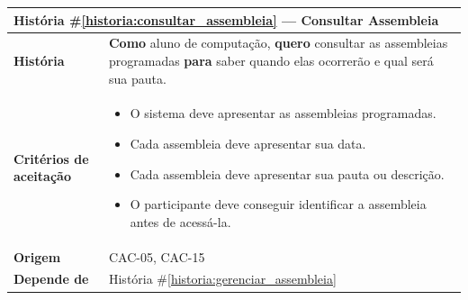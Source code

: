 \documentclass[12pt,a4paper]{article}
\newcounter{historia}
\begin{document}
\label{historia:consultar_assembleia}
\begin{table}[H]
    \centering
    \begin{tabular}{|m{4.5cm} | m{11cm}|}
    \hline
    
    \multicolumn{2}{|l|}{\textbf{História \#\ref{historia:consultar_assembleia} --- Consultar Assembleia}} \\
    
    \hline  \textbf{História} &
    \textbf{Como} aluno de computação, \newline
    \textbf{quero} consultar as assembleias programadas \newline  
    \textbf{para} saber quando elas ocorrerão e qual será sua pauta. \\
    
    \textbf{Critérios de aceitação} &
    \begin{itemize}
        \item{ O sistema deve apresentar as assembleias programadas.}
        \item{Cada assembleia deve apresentar sua data.}
        \item{Cada assembleia deve apresentar sua pauta ou descrição.}
        \item{O participante deve conseguir identificar a assembleia antes de acessá-la.}
    \end{itemize}\\
    
    \textbf{Origem} &
    CAC-05, CAC-15 \\
    
    \textbf{Depende de} &
    História \#\ref{historia:gerenciar_assembleia} \\
    \hline
    \end{tabular}
\end{table}
\label{historia:gerenciar_assembleia}
\end{document}
